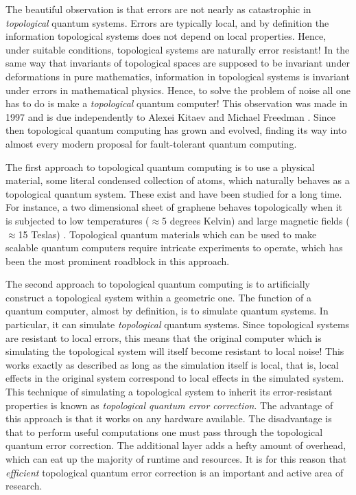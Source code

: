 \documentclass{article}
\theoremstyle{definition}
\numberwithin{figure}{section}
\begin{document}
The beautiful observation is that errors are not nearly as catastrophic in \textit{topological} quantum systems. Errors are typically local, and by definition the information topological systems does not depend on local properties. Hence, under suitable conditions, topological systems are naturally error resistant! In the same way that invariants of topological spaces are supposed to be invariant under deformations in pure mathematics, information in topological systems is invariant under errors in mathematical physics. Hence, to solve the problem of noise all one has to do is make a \textit{topological} quantum computer! This observation was made in 1997 and is due independently to Alexei Kitaev and Michael Freedman \cite{kitaev2003fault, freedman1998p}. Since then topological quantum computing has grown and evolved, finding its way into almost every modern proposal for fault-tolerant quantum computing.

The first approach to topological quantum computing is to use a physical material, some literal condensed collection of atoms, which naturally behaves as a topological quantum system. These exist and have been studied for a long time. For instance, a two dimensional sheet of graphene behaves topologically when it is subjected to low temperatures ($\approx$5 degrees Kelvin) and large magnetic fields ($\approx$15 Teslas) \cite{bolotin2009observation}. Topological quantum materials which can be used to make scalable quantum computers require intricate experiments to operate, which has been the most prominent roadblock in this approach.

The second approach to topological quantum computing is to artificially construct a topological system within a geometric one. The function of a quantum computer, almost by definition, is to simulate quantum systems. In particular, it can simulate \textit{topological} quantum systems. Since topological systems are resistant to local errors, this means that the original computer which is simulating the topological system will itself become resistant to local noise! This works exactly as described as long as the simulation itself is local, that is, local effects in the original system correspond to local effects in the simulated system. This technique of simulating a topological system to inherit its error-resistant properties is known as \textit{topological quantum error correction}. The advantage of this approach is that it works on any hardware available. The disadvantage is that to perform useful computations one must pass through the topological quantum error correction. The additional layer adds a hefty amount of overhead, which can eat up the majority of runtime and resources. It is for this reason that \textit{efficient} topological quantum error correction is an important and active area of research.
\end{document}
